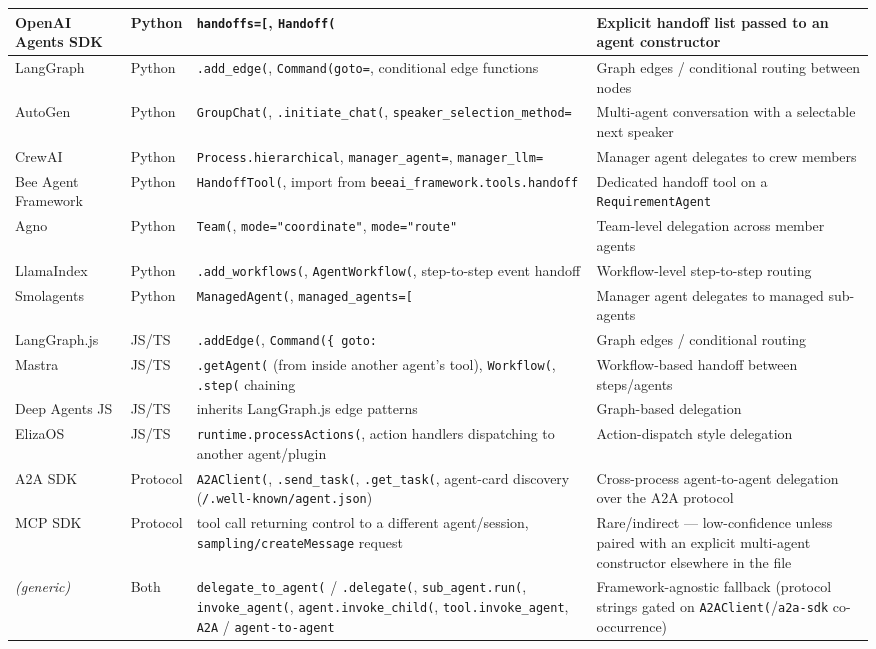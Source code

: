 {\begin{longtable}{@{}p{}p{}p{}p{}@{}}
OpenAI Agents SDK & Python & \texttt{handoffs=[}, \texttt{Handoff(} & Explicit handoff list passed to an agent constructor \\ \midrule
LangGraph & Python & \texttt{.add\_edge(}, \texttt{Command(goto=}, conditional edge functions & Graph edges / conditional routing between nodes \\ \midrule
AutoGen & Python & \texttt{GroupChat(}, \texttt{.initiate\_chat(}, \texttt{speaker\_selection\_method=} & Multi-agent conversation with a selectable next speaker \\ \midrule
CrewAI & Python & \texttt{Process.hierarchical}, \texttt{manager\_agent=}, \texttt{manager\_llm=} & Manager agent delegates to crew members \\ \midrule
Bee Agent Framework & Python & \texttt{HandoffTool(}, import from \texttt{beeai\_framework.tools.handoff} & Dedicated handoff tool on a \texttt{RequirementAgent} \\ \midrule
Agno & Python & \texttt{Team(}, \texttt{mode="coordinate"}, \texttt{mode="route"} & Team-level delegation across member agents \\ \midrule
LlamaIndex & Python & \texttt{.add\_workflows(}, \texttt{AgentWorkflow(}, step-to-step event handoff & Workflow-level step-to-step routing \\ \midrule
Smolagents & Python & \texttt{ManagedAgent(}, \texttt{managed\_agents=[} & Manager agent delegates to managed sub-agents \\ \midrule
LangGraph.js & JS/TS & \texttt{.addEdge(}, \texttt{Command(\{ goto:} & Graph edges / conditional routing \\ \midrule
Mastra & JS/TS & \texttt{.getAgent(} (from inside another agent's tool), \texttt{Workflow(}, \texttt{.step(} chaining & Workflow-based handoff between steps/agents \\ \midrule
Deep Agents JS & JS/TS & inherits LangGraph.js edge patterns & Graph-based delegation \\ \midrule
ElizaOS & JS/TS & \texttt{runtime.processActions(}, action handlers dispatching to another agent/plugin & Action-dispatch style delegation \\ \midrule
A2A SDK & Protocol & \texttt{A2AClient(}, \texttt{.send\_task(}, \texttt{.get\_task(}, agent-card discovery (\texttt{/.well-known/agent.json}) & Cross-process agent-to-agent delegation over the A2A protocol \\ \midrule
MCP SDK & Protocol & tool call returning control to a different agent/session, \texttt{sampling/createMessage} request & Rare/indirect --- low-confidence unless paired with an explicit multi-agent constructor elsewhere in the file \\ \midrule
\textit{(generic)} & Both & \texttt{delegate\_to\_agent(} / \texttt{.delegate(}, \texttt{sub\_agent.run(}, \texttt{invoke\_agent(}, \texttt{agent.invoke\_child(}, \texttt{tool.invoke\_agent}, \texttt{A2A} / \texttt{agent-to-agent} & Framework-agnostic fallback (protocol strings gated on \texttt{A2AClient(}/\texttt{a2a-sdk} co-occurrence) \\ \midrule

\end{longtable}
}
